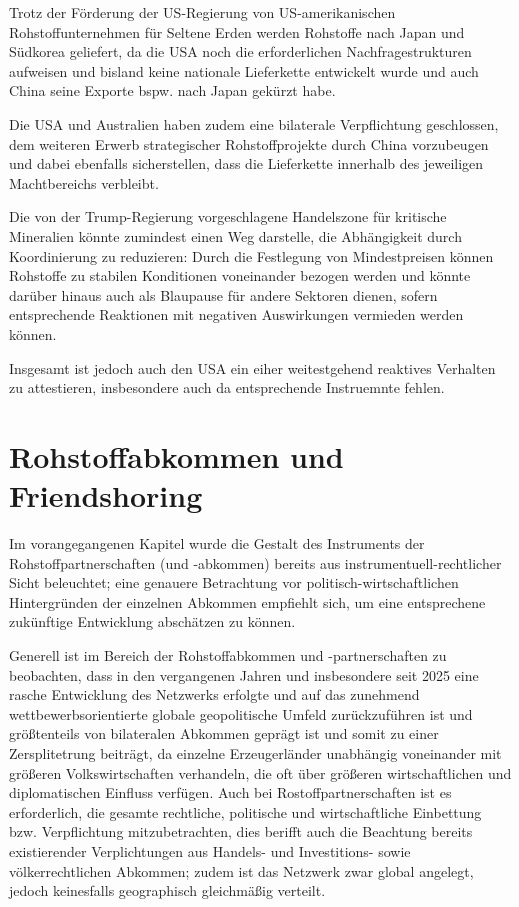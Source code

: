 \documentclass[12pt,a4paper,oneside]{book} %
\begin{document}
{Trotz der Förderung der US-Regierung von US-amerikanischen Rohstoffunternehmen für Seltene Erden werden Rohstoffe nach Japan und Südkorea geliefert, da die USA noch die erforderlichen Nachfragestrukturen aufweisen und bisland keine nationale Lieferkette entwickelt wurde und auch China seine Exporte bspw. nach Japan gekürzt habe.

Die USA und Australien haben zudem eine bilaterale Verpflichtung geschlossen, dem weiteren Erwerb strategischer Rohstoffprojekte durch China vorzubeugen und dabei ebenfalls sicherstellen, dass die Lieferkette innerhalb des jeweiligen Machtbereichs verbleibt.

Die von der Trump-Regierung vorgeschlagene Handelszone für kritische Mineralien könnte zumindest einen Weg darstelle, die Abhängigkeit durch Koordinierung zu reduzieren: Durch die Festlegung von Mindestpreisen können Rohstoffe zu stabilen Konditionen voneinander bezogen werden und könnte darüber hinaus auch als Blaupause für andere Sektoren dienen, sofern entsprechende Reaktionen mit negativen Auswirkungen vermieden werden können.\autocite{Fishman}

Insgesamt ist jedoch auch den USA ein eiher weitestgehend reaktives Verhalten zu attestieren, insbesondere auch da entsprechende Instruemnte fehlen.\autocite{CSIS: Why the West Keeps Losing Critical Mineral Assets to China}


\section{Rohstoffabkommen und Friendshoring}
Im vorangegangenen Kapitel wurde die Gestalt des Instruments der Rohstoffpartnerschaften (und -abkommen) bereits aus instrumentuell-rechtlicher Sicht beleuchtet; eine genauere Betrachtung vor politisch-wirtschaftlichen Hintergründen der einzelnen Abkommen empfiehlt sich, um eine entsprechene zukünftige Entwicklung abschätzen zu können.

Generell ist im Bereich der Rohstoffabkommen und -partnerschaften zu beobachten, dass in den vergangenen Jahren und insbesondere seit 2025 eine rasche Entwicklung des Netzwerks erfolgte und auf das zunehmend wettbewerbsorientierte globale geopolitische Umfeld zurückzuführen ist und größtenteils von bilateralen Abkommen geprägt ist und somit zu einer Zersplitetrung beiträgt, da einzelne Erzeugerländer unabhängig voneinander mit größeren Volkswirtschaften verhandeln, die oft über größeren wirtschaftlichen und diplomatischen Einfluss verfügen.\autocite{Cotula: Critical minerals agreemnets. typology, trends and implications, S. 6} Auch bei Rostoffpartnerschaften ist es erforderlich, die gesamte rechtliche, politische und wirtschaftliche Einbettung bzw. Verpflichtung mitzubetrachten, dies berifft auch die Beachtung bereits existierender Verplichtungen aus Handels- und Investitions- sowie völkerrechtlichen Abkommen; zudem ist das Netzwerk zwar global angelegt, jedoch keinesfalls geographisch gleichmäßig verteilt.\autocite{Cotula: Critical minerals agreemnets. typology, trends and implications, S. 6}

}
\end{document}
